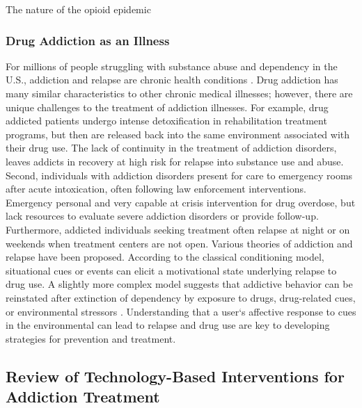 \documentclass[sigconf]{acmart}
\begin{document}
The nature of the opioid epidemic \cite{volkow14}



\subsubsection{Drug Addiction as an Illness}

For millions of people struggling with substance abuse and dependency in 
the U.S., addiction and relapse are chronic health conditions \cite{boyer10}. 
Drug addiction has many similar characteristics to other chronic medical 
illnesses; however, there are unique challenges to the treatment of addiction
illnesses. For example, drug addicted patients undergo intense detoxification 
in rehabilitation treatment programs, but then are released back into the same 
environment associated with their drug use. The lack of continuity in the 
treatment of addiction disorders, leaves addicts in recovery at high risk for
relapse into substance use and abuse. Second, individuals with addiction 
disorders present for care to emergency rooms after acute intoxication, often 
following law enforcement interventions. Emergency personal and very capable 
at crisis intervention for drug overdose, but lack resources to evaluate severe 
addiction disorders or provide follow-up. Furthermore, addicted individuals 
seeking treatment often relapse at night or on weekends when treatment centers 
are not open. Various theories of addiction and relapse have been proposed. 
According to the classical conditioning model, situational cues or events can 
elicit a motivational state underlying relapse to drug use. A slightly more 
complex model suggests that addictive behavior can be reinstated after 
extinction of dependency by exposure to drugs, drug-related cues, or 
environmental stressors \cite{shaham03}. Understanding that a user`s affective
response to cues in the environmental can lead to relapse and drug use are key 
to developing strategies for prevention and treatment. 


\subsection{Review of Technology-Based Interventions for Addiction Treatment}
\end{document}
